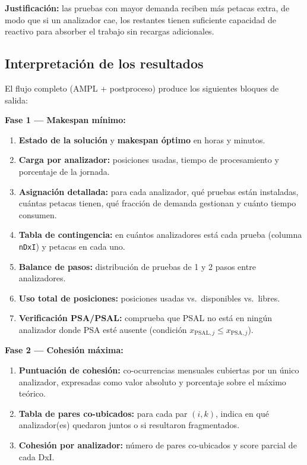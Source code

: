 \documentclass[12pt, a4paper]{article}
\begin{document}
\textbf{Justificación:} las pruebas con mayor demanda reciben más petacas extra, de modo que
si un analizador cae, los restantes tienen suficiente capacidad de reactivo para absorber
el trabajo sin recargas adicionales.

\subsection{Interpretación de los resultados}

El flujo completo (AMPL + postproceso) produce los siguientes bloques de salida:

\textbf{Fase 1 — Makespan mínimo:}
\begin{enumerate}
  \item \textbf{Estado de la solución} y \textbf{makespan óptimo} en horas y minutos.
  \item \textbf{Carga por analizador:} posiciones usadas, tiempo de procesamiento y
        porcentaje de la jornada.
  \item \textbf{Asignación detallada:} para cada analizador, qué pruebas están instaladas,
        cuántas petacas tienen, qué fracción de demanda gestionan y cuánto tiempo consumen.
  \item \textbf{Tabla de contingencia:} en cuántos analizadores está cada prueba (columna
        \texttt{nDxI}) y petacas en cada uno.
  \item \textbf{Balance de pasos:} distribución de pruebas de 1 y 2 pasos entre analizadores.
  \item \textbf{Uso total de posiciones:} posiciones usadas vs.\ disponibles vs.\ libres.
  \item \textbf{Verificación PSA/PSAL:} comprueba que PSAL no está en ningún analizador
        donde PSA esté ausente (condición $x_{\text{PSAL},j} \leq x_{\text{PSA},j}$).
\end{enumerate}

\textbf{Fase 2 — Cohesión máxima:}
\begin{enumerate}[resume]
  \item \textbf{Puntuación de cohesión:} co-ocurrencias mensuales cubiertas por un único
        analizador, expresadas como valor absoluto y porcentaje sobre el máximo teórico.
  \item \textbf{Tabla de pares co-ubicados:} para cada par $(i,k)$, indica en qué
        analizador(es) quedaron juntos o si resultaron fragmentados.
  \item \textbf{Cohesión por analizador:} número de pares co-ubicados y score parcial
        de cada DxI.
\end{enumerate}
\end{document}
